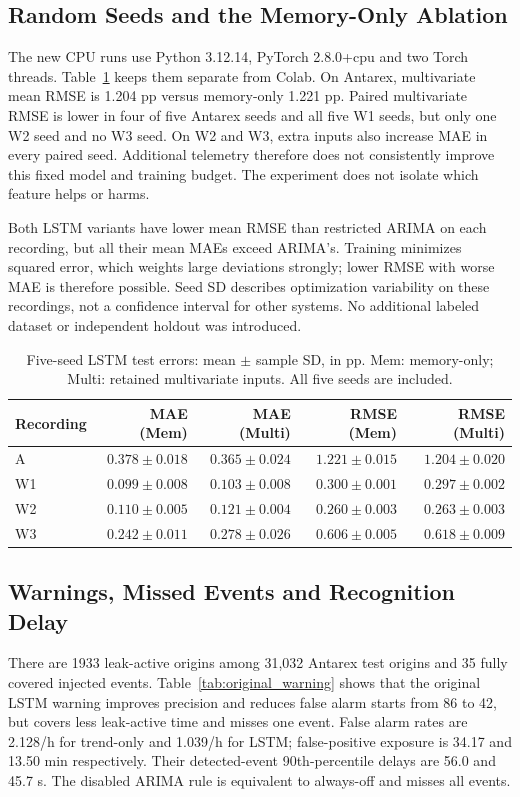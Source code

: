 \subsection{Random Seeds and the Memory-Only Ablation}
The new CPU runs use Python 3.12.14, PyTorch 2.8.0+cpu and two Torch threads. Table~\ref{tab:ablation} keeps them separate from Colab. On Antarex, multivariate mean RMSE is 1.204 pp versus memory-only 1.221 pp. Paired multivariate RMSE is lower in four of five Antarex seeds and all five W1 seeds, but only one W2 seed and no W3 seed. On W2 and W3, extra inputs also increase MAE in every paired seed. Additional telemetry therefore does not consistently improve this fixed model and training budget. The experiment does not isolate which feature helps or harms.

Both LSTM variants have lower mean RMSE than restricted ARIMA on each recording, but all their mean MAEs exceed ARIMA's. Training minimizes squared error, which weights large deviations strongly; lower RMSE with worse MAE is therefore possible. Seed SD describes optimization variability on these recordings, not a confidence interval for other systems. No additional labeled dataset or independent holdout was introduced.


\begin{table}[htbp]
\caption{Five-seed LSTM test errors: mean $\pm$ sample SD, in pp. Mem: memory-only; Multi: retained multivariate inputs. All five seeds are included.}
\label{tab:ablation}
\centering\small
\setlength{\tabcolsep}{4pt}
\begin{tabular}{@{}lrrrr@{}}
\toprule
Recording & MAE (Mem) & MAE (Multi) & RMSE (Mem) & RMSE (Multi)\\
\midrule
A & $0.378\pm0.018$ & $0.365\pm0.024$ & $1.221\pm0.015$ & $1.204\pm0.020$\\
W1 & $0.099\pm0.008$ & $0.103\pm0.008$ & $0.300\pm0.001$ & $0.297\pm0.002$\\
W2 & $0.110\pm0.005$ & $0.121\pm0.004$ & $0.260\pm0.003$ & $0.263\pm0.003$\\
W3 & $0.242\pm0.011$ & $0.278\pm0.026$ & $0.606\pm0.005$ & $0.618\pm0.009$\\
\bottomrule
\end{tabular}
\end{table}


\subsection{Warnings, Missed Events and Recognition Delay}
There are 1933 leak-active origins among 31,032 Antarex test origins and 35 fully covered injected events. Table~\ref{tab:original_warning} shows that the original LSTM warning improves precision and reduces false alarm starts from 86 to 42, but covers less leak-active time and misses one event. False alarm rates are 2.128/h for trend-only and 1.039/h for LSTM; false-positive exposure is 34.17 and 13.50 min respectively. Their detected-event 90th-percentile delays are 56.0 and 45.7 s. The disabled ARIMA rule is equivalent to always-off and misses all events.

